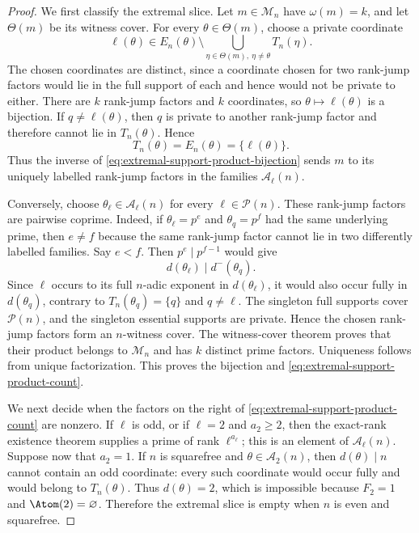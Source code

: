 \begin{proof}
We first classify the extremal slice. Let $m\in\mathcal M_n$ have
$\omega(m)=k$, and let $\Theta(m)$ be its witness cover. For every
$\theta\in\Theta(m)$, choose a private coordinate
\[
 \ell(\theta)\in E_n(\theta)\setminus
 \bigcup_{\eta\in\Theta(m),\ \eta\ne\theta}T_n(\eta).
\]
The chosen coordinates are distinct, since a coordinate chosen for two rank-jump factors
would lie in the full support of each and hence would not be private to either.
There are $k$ rank-jump factors and $k$ coordinates, so $\theta\mapsto\ell(\theta)$ is a
bijection. If $q\ne\ell(\theta)$, then $q$ is private to another rank-jump factor and
therefore cannot lie in $T_n(\theta)$. Hence
\[
 T_n(\theta)=E_n(\theta)=\{\ell(\theta)\}.
\]
Thus the inverse of \eqref{eq:extremal-support-product-bijection} sends $m$
to its uniquely labelled rank-jump factors in the families $\mathcal A_\ell(n)$.

Conversely, choose $\theta_\ell\in\mathcal A_\ell(n)$ for every
$\ell\in\mathcal P(n)$.
These rank-jump factors are pairwise coprime. Indeed, if
$\theta_\ell=p^e$ and $\theta_q=p^f$ had the same underlying prime, then
$e\ne f$ because the same rank-jump factor cannot lie in two differently labelled
families. Say $e<f$. Then $p^e\mid p^{f-1}$ would give
\[
 d(\theta_\ell)\mid d^-(\theta_q).
\]
Since $\ell$ occurs to its full $n$-adic exponent in $d(\theta_\ell)$, it
would also occur fully in $d(\theta_q)$, contrary to
$T_n(\theta_q)=\{q\}$ and $q\ne\ell$. The singleton full supports cover
$\mathcal P(n)$, and the singleton essential supports are private. Hence the
chosen rank-jump factors form an $n$-witness cover. The witness-cover theorem proves that
their product belongs to $\mathcal M_n$ and has $k$ distinct prime factors.
Uniqueness follows from unique factorization. This proves the bijection and
\eqref{eq:extremal-support-product-count}.

We next decide when the factors on the right of
\eqref{eq:extremal-support-product-count} are nonzero. If $\ell$ is odd, or
if $\ell=2$ and $a_2\ge2$, then the exact-rank existence theorem supplies a
prime of rank $\ell^{a_\ell}$; this is an element of
$\mathcal A_\ell(n)$. Suppose now that $a_2=1$. If $n$ is squarefree and
$\theta\in\mathcal A_2(n)$, then $d(\theta)\mid n$ cannot contain an odd
coordinate: every such coordinate would occur fully and would belong to
$T_n(\theta)$. Thus $d(\theta)=2$, which is impossible because $F_2=1$ and
$\Atom(2)=\varnothing$. Therefore the extremal slice is empty when $n$ is
even and squarefree.


\end{proof}
